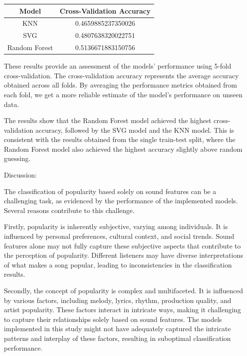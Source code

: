 \documentclass[11pt]{article} %
\begin{document}
\begin{table}[H]
	\centering
	\begin{tabular}{cc}
	\hline
	\textbf{Model} & \textbf{Cross-Validation Accuracy} \\
	\hline
	KNN & 0.4659885237350026 \\
	SVG & 0.4807638320022751 \\
	Random Forest & 0.5136671883150756 \\
	\hline
	\end{tabular}
\end{table}


These results provide an assessment of the models' performance using 5-fold cross-validation. The cross-validation accuracy represents the average accuracy obtained across all folds.
By averaging the performance metrics obtained from each fold, we get a more reliable estimate of the model's performance on unseen data. 

The results show that the Random Forest model achieved the highest cross-validation accuracy, followed by the SVG model and the KNN model. This is consistent with the results obtained from the single train-test split, where the Random Forest model also achieved the highest accuracy slightly above random guessing.

\newblock



Discussion:

The classification of popularity based solely on sound features can be a challenging task, as evidenced by the performance of the implemented models. Several reasons contribute to this challenge.

Firstly, popularity is inherently subjective, varying among individuals. It is influenced by personal preferences, cultural context, and social trends. Sound features alone may not fully capture these subjective aspects that contribute to the perception of popularity. Different listeners may have diverse interpretations of what makes a song popular, leading to inconsistencies in the classification results.

Secondly, the concept of popularity is complex and multifaceted. It is influenced by various factors, including melody, lyrics, rhythm, production quality, and artist popularity. These factors interact in intricate ways, making it challenging to capture their relationships solely based on sound features. The models implemented in this study might not have adequately captured the intricate patterns and interplay of these factors, resulting in suboptimal classification performance.
\end{document}
